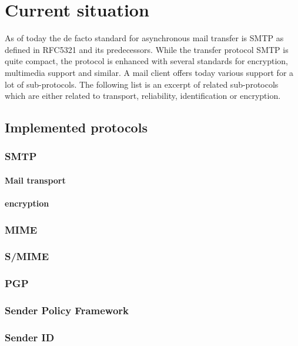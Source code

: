 \chapter{Current situation}
As of today the de facto standard for asynchronous mail transfer is SMTP as defined in RFC5321\cite{RFC5321} and its predecessors. While the transfer protocol SMTP is quite compact, the protocol is enhanced with several standards for encryption, multimedia support and similar. A mail client offers today various support for a lot of sub-protocols. The following list is an excerpt of related sub-protocols which are either related to transport, reliability, identification or encryption. 

\section{Implemented protocols}
\subsection{SMTP}
\cite{RFC5321}
\subsubsection{Mail transport}
\cite{RFC1870}
\subsubsection{encryption}

\subsection{MIME}
\cite{RFC2045}
\cite{RFC2046}
\cite{RFC2047}
\cite{RFC2048}
\cite{RFC2049}

\subsection{S/MIME}
\cite{RFC3851}

\subsection{PGP}
\cite{RFC2440}

\subsection{Sender Policy Framework}
\cite{RFC4408}
\cite{RFC6652}

\subsection{Sender ID}
\cite{RFC4401}

